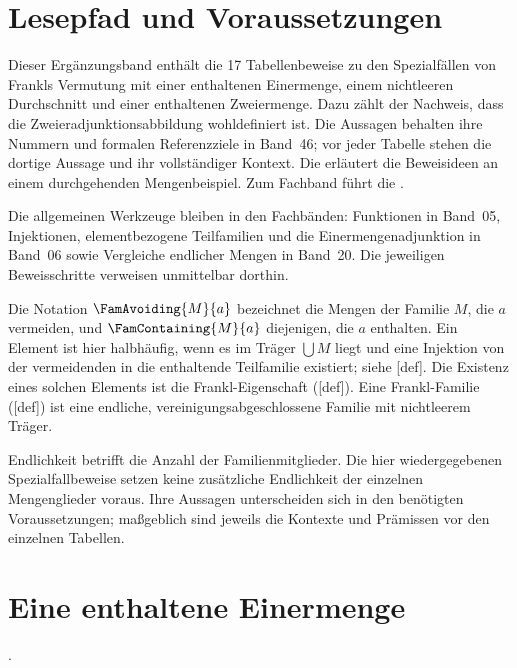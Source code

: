 \section*{Lesepfad und Voraussetzungen}
Dieser Ergänzungsband enthält die 17 Tabellenbeweise zu den Spezialfällen
von Frankls Vermutung mit einer enthaltenen Einermenge, einem nichtleeren
Durchschnitt und einer enthaltenen Zweiermenge. Dazu zählt der Nachweis,
dass die Zweieradjunktionsabbildung wohldefiniert ist.
Die Aussagen behalten ihre Nummern und formalen Referenzziele in Band~46;
vor jeder Tabelle stehen die dortige Aussage und ihr vollständiger Kontext.
Die \FranklReadingLink{} erläutert die Beweisideen an einem durchgehenden
Mengenbeispiel. Zum Fachband führt die \FranklMainLink{}.

Die allgemeinen Werkzeuge bleiben in den Fachbänden: Funktionen in
Band~05, Injektionen, elementbezogene Teilfamilien und die
Einermengenadjunktion in Band~06 sowie Vergleiche endlicher Mengen
in Band~20. Die jeweiligen Beweisschritte verweisen unmittelbar dorthin.

Die Notation \(\FamAvoiding{M}{a}\) bezeichnet die Mengen der Familie \(M\),
die \(a\) vermeiden, und \(\FamContaining{M}{a}\) diejenigen, die \(a\)
enthalten. Ein Element ist hier halbhäufig, wenn es im Träger \(\bigcup M\)
liegt und eine Injektion von der vermeidenden in die enthaltende Teilfamilie
existiert; siehe [def].
Die Existenz eines solchen Elements ist die Frankl-Eigenschaft
([def]). Eine Frankl-Familie
([def]) ist eine endliche,
vereinigungsabgeschlossene Familie mit nichtleerem Träger.

Endlichkeit betrifft die Anzahl der Familienmitglieder. Die hier
wiedergegebenen Spezialfallbeweise setzen keine zusätzliche Endlichkeit
der einzelnen Mengenglieder voraus. Ihre Aussagen unterscheiden sich in
den benötigten Voraussetzungen; maßgeblich sind jeweils die Kontexte
und Prämissen vor den einzelnen Tabellen.

\par{}
\section*{Eine enthaltene Einermenge}
\noindent{}.\par

